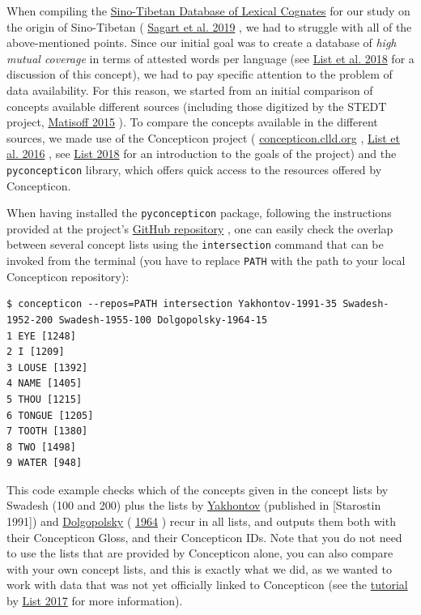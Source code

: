 \documentclass[
  a4paper,
  14pt,
  oneside,
  tablecaptionabove
]{scrbook}
\newcommand{\passthrough}[1]{#1}
\begin{document}
When compiling the
\href{https://dighl.github.io/sinotibetan}{Sino-Tibetan Database of
Lexical Cognates} for our study on the origin of Sino-Tibetan (
\href{http://bibliography.lingpy.org?key=Sagart2019}{Sagart et al. 2019}
, we had to struggle with all of the above-mentioned points. Since our
initial goal was to create a database of \emph{high mutual coverage} in
terms of attested words per language (see
\href{http://bibliography.lingpy.org?key=List2018d}{List et al. 2018}
for a discussion of this concept), we had to pay specific attention to
the problem of data availability. For this reason, we started from an
initial comparison of concepts available different sources (including
those digitized by the STEDT project,
\href{http://bibliography.lingpy.org?key=Matisoff2015}{Matisoff 2015} ).
To compare the concepts available in the different sources, we made use
of the Concepticon project (
\href{https://concepticon.clld.org}{concepticon.clld.org} ,
\href{http://bibliography.lingpy.org?key=List2016a}{List et al. 2016} ,
see \href{http://bibliography.lingpy.org?key=List2018h}{List 2018} for
an introduction to the goals of the project) and the
\passthrough{\lstinline!pyconcepticon!} library, which offers quick
access to the resources offered by Concepticon.

When having installed the \passthrough{\lstinline!pyconcepticon!}
package, following the instructions provided at the project's
\href{https://github.com/concepticon/pyconcepticon/}{GitHub repository}
, one can easily check the overlap between several concept lists using
the \passthrough{\lstinline!intersection!} command that can be invoked
from the terminal (you have to replace \passthrough{\lstinline!PATH!}
with the path to your local Concepticon repository):

\begin{lstlisting}
$ concepticon --repos=PATH intersection Yakhontov-1991-35 Swadesh-1952-200 Swadesh-1955-100 Dolgopolsky-1964-15
1 EYE [1248]
2 I [1209]
3 LOUSE [1392]
4 NAME [1405]
5 THOU [1215]
6 TONGUE [1205]
7 TOOTH [1380]
8 TWO [1498]
9 WATER [948]
\end{lstlisting}

This code example checks which of the concepts given in the concept
lists by Swadesh (100 and 200) plus the lists by
\href{https://concepticon.clld.org/contributions/Yakhontov-1991-35}{Yakhontov}
(published in {[}Starostin 1991{]}) and
\href{https://concepticon.clld.org/contributions/Dolgopolsky-1964-15}{Dolgopolsky}
( \href{http://bibliography.lingpy.org?key=Dolgopolsky1964}{1964} )
recur in all lists, and outputs them both with their Concepticon Gloss,
and their Concepticon IDs. Note that you do not need to use the lists
that are provided by Concepticon alone, you can also compare with your
own concept lists, and this is exactly what we did, as we wanted to work
with data that was not yet officially linked to Concepticon (see the
\href{https://github.com/digling/edictor-tutorial}{tutorial} by
\href{http://bibliography.lingpy.org?key=List2017LECTUREd}{List 2017}
for more information).
\end{document}
